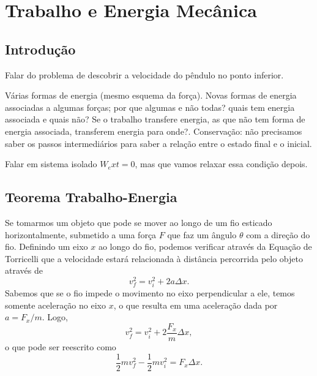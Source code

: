 \chapter{Trabalho e Energia Mecânica}
\label{Chap:Energia}





\section{Introdução} 
{\it

Falar do problema de descobrir a velocidade do pêndulo no ponto inferior.

Várias formas de energia (mesmo esquema da força). Novas formas de energia associadas a algumas forças; por que algumas e não todas? quais tem energia associada e quais não? Se o trabalho transfere energia, as que não tem forma de energia associada, transferem energia para onde?. Conservação: não precisamos saber os passos intermediários para saber a relação entre o estado final e o inicial.

Falar em sistema isolado $W_ext = 0$, mas que vamos relaxar essa condição depois.

}

\section{Teorema Trabalho-Energia}


Se tomarmos um objeto que pode se mover ao longo de um fio esticado horizontalmente, submetido a uma força $F$ que faz um ângulo $\theta$ com a direção do fio. Definindo um eixo $x$ ao longo do fio, podemos verificar através da Equação de Torricelli que a velocidade estará relacionada à distância percorrida pelo objeto através de
\begin{equation}
  v_f^2 = v_i^2 + 2 a \Delta x.
\end{equation}
%
Sabemos que se o fio impede o movimento no eixo perpendicular a ele, temos somente aceleração no eixo $x$, o que resulta em uma aceleração dada por $a = F_x/m$. Logo,
\begin{equation}
  v_f^2 = v_i^2 + 2 \frac{F_x}{m} \Delta x,
\end{equation}
%
o que pode ser reescrito como
\begin{equation}
  \frac{1}{2} m v_f^2 - \frac{1}{2} m v_i^2 = F_x \Delta x.
\end{equation}

